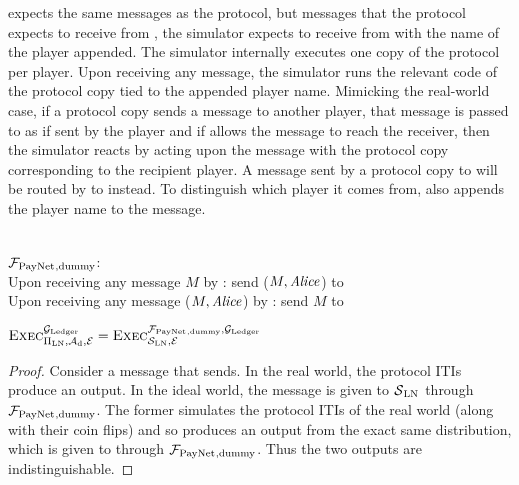 \simulator{} expects the same messages as the protocol, but messages that the
protocol expects to receive from \environment, the simulator expects to receive
from \fpaynet{} with the name of the player appended. The simulator internally
executes one copy of the protocol per player. Upon receiving any message, the
simulator runs the relevant code of the protocol copy tied to the appended
player name. Mimicking the real-world case, if a protocol copy sends a message
to another player, that message is passed to \adversary{} as if sent by the
player and if \adversary{} allows the message to reach the receiver, then the
simulator reacts by acting upon the message with the protocol copy corresponding
to the recipient player. A message sent by a protocol copy to \environment{}
will be routed by \simulator{} to \fpaynet{} instead. To distinguish which
player it comes from, \simulator{} also appends the player name to the message.

\noindent \hrulefill \\
$\mathcal{F}_{\mathrm{PayNet}}{}_{\mathrm{, dummy}}$: \\
Upon receiving any message $M$ by \alice: send ($M, \mathit{Alice}$) to \simulator \\
Upon receiving any message ($M, \mathit{Alice}$) by \simulator: send $M$ to \alice

\begin{lemma}
  \label{lemma:dummyfunc}
  $\textsc{Exec}^{\mathcal{G}_{\mathrm{Ledger}}}_{\Pi_{\mathrm{LN}}, \mathcal{A}_{\mathrm{d}},
  \mathcal{E}} = \textsc{Exec}^{\mathcal{F}_{\mathrm{PayNet}}{}_{\mathrm{, dummy}},
  \mathcal{G}_{\mathrm{Ledger}}}_{\mathcal{S}_{\mathrm{LN}}, \mathcal{E}}$
\end{lemma}
\begin{proof}
  Consider a message that \environment{} sends. In the real world, the protocol
  ITIs produce an output. In the ideal world, the message is given to
  $\mathcal{S}{}_{\mathrm{LN}}$ through $\mathcal{F}_{\mathrm{PayNet}}{}_{\mathrm{, dummy}}$. The
  former simulates the protocol ITIs of the real world (along with their coin
  flips) and so produces an output from the exact same distribution, which is
  given to \environment{} through $\mathcal{F}_{\mathrm{PayNet}}{}_{\mathrm{, dummy}}$. Thus the two
  outputs are indistinguishable.
\end{proof}
